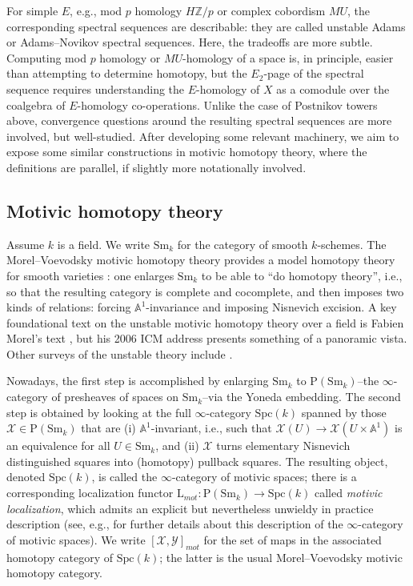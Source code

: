 \documentclass[11pt,leqno]{article}
\renewcommand{\P}{{\mathrm P}}
\newcommand{\aone}{{\mathbb A}^1}
\renewcommand{\1}{{\rm 1\hspace*{-0.4ex}%
\rule{0.1ex}{1.52ex}\hspace*{0.2ex}}}
\renewcommand{\L}{{\mathrm L}}
\newcommand{\Sm}{\mathrm{Sm}}
\newcommand{\Spc}{\mathrm{Spc}}
\newcommand{\<}[1]{{\langle}#1 {\rangle}}
\theoremstyle{plain}
\theoremstyle{definition}
\theoremstyle{remark}
\numberwithin{equation}{subsection}
\begin{document}
For simple $E$, e.g., mod $p$ homology $H\mathbb{Z}/p$ or complex cobordism $MU$, the corresponding spectral sequences are describable: they are called unstable Adams or Adams--Novikov spectral sequences.  Here, the tradeoffs are more subtle.  Computing mod $p$ homology or $MU$-homology of a space is, in principle, easier than attempting to determine homotopy, but the $E_2$-page of the spectral sequence requires understanding the $E$-homology of $X$ as a comodule over the coalgebra of $E$-homology co-operations.  Unlike the case of Postnikov towers above, convergence questions around the resulting spectral sequences are more involved, but well-studied.  After developing some relevant machinery, we aim to expose some similar constructions in motivic homotopy theory, where the definitions are parallel, if slightly more notationally involved.

\subsection{Motivic homotopy theory}
\label{ss:motivichomotopytheory}
Assume $k$ is a field.  We write $\Sm_k$ for the category of smooth $k$-schemes.  The Morel--Voevodsky motivic homotopy theory provides a model homotopy theory for smooth varieties \cite{MV}: one enlarges $\Sm_k$ to be able to ``do homotopy theory'', i.e., so that the resulting category is complete and cocomplete, and then imposes two kinds of relations: forcing $\aone$-invariance and imposing Nisnevich excision.  A key foundational text on the unstable motivic homotopy theory over a field is Fabien Morel's text \cite{MField}, but his 2006 ICM address \cite{MICM} presents something of a panoramic vista. Other surveys of the unstable theory include \cite{AntieauElmanto,WickelgrenWilliamsSurvey}.

Nowadays, the first step is accomplished by enlarging $\Sm_k$ to $\P(\Sm_k)$--the $\infty$-category of presheaves of spaces on $\Sm_k$--via the Yoneda embedding.  The second step is obtained by looking at the full $\infty$-category $\Spc(k)$ spanned by those $\mathscr{X} \in \P(\Sm_k)$ that are (i) $\aone$-invariant, i.e., such that $\mathscr{X}(U) \to \mathscr{X}(U \times \aone)$ is an equivalence for all $U \in \Sm_k$, and (ii) $\mathscr{X}$ turns elementary Nisnevich distinguished squares into (homotopy) pullback squares.  The resulting object, denoted $\Spc(k)$, is called the $\infty$-category of motivic spaces; there is a corresponding localization functor $\L_{mot}: \P(\Sm_k) \to \Spc(k)$ called {\em motivic localization}, which admits an explicit but nevertheless unwieldy in practice description (see, e.g., \cite[\S 3]{Hoyois2017SixOperations} for further details about this description of the $\infty$-category of motivic spaces).  We write $[\mathscr{X},\mathscr{Y}]_{mot}$ for the set of maps in the associated homotopy category of $\Spc(k)$; the latter is the usual Morel--Voevodsky motivic homotopy category.
\end{document}
